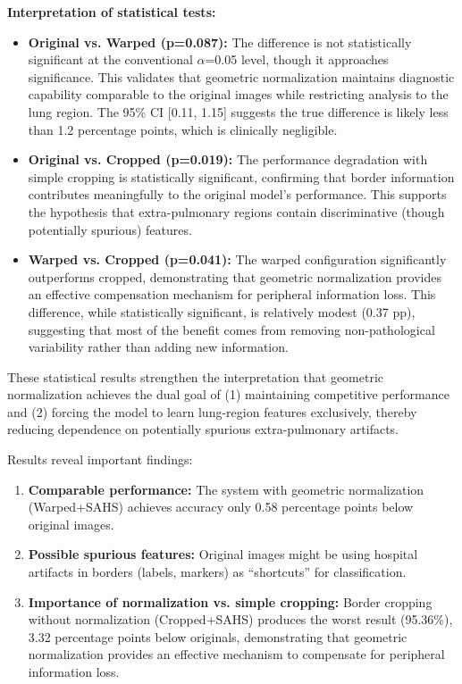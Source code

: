 \documentclass[applsci,article,submit,pdftex,moreauthors]{Definitions/mdpi}
\begin{document}
\textbf{Interpretation of statistical tests:}

\begin{itemize}
\item \textbf{Original vs. Warped (p=0.087):} The difference is not statistically significant at the conventional $\alpha$=0.05 level, though it approaches significance. This validates that geometric normalization maintains diagnostic capability comparable to the original images while restricting analysis to the lung region. The 95\% CI [0.11, 1.15] suggests the true difference is likely less than 1.2 percentage points, which is clinically negligible.

\item \textbf{Original vs. Cropped (p=0.019):} The performance degradation with simple cropping is statistically significant, confirming that border information contributes meaningfully to the original model's performance. This supports the hypothesis that extra-pulmonary regions contain discriminative (though potentially spurious) features.

\item \textbf{Warped vs. Cropped (p=0.041):} The warped configuration significantly outperforms cropped, demonstrating that geometric normalization provides an effective compensation mechanism for peripheral information loss. This difference, while statistically significant, is relatively modest (0.37 pp), suggesting that most of the benefit comes from removing non-pathological variability rather than adding new information.
\end{itemize}

These statistical results strengthen the interpretation that geometric normalization achieves the dual goal of (1) maintaining competitive performance and (2) forcing the model to learn lung-region features exclusively, thereby reducing dependence on potentially spurious extra-pulmonary artifacts.

Results reveal important findings:

\begin{enumerate}
\item \textbf{Comparable performance:} The system with geometric normalization (Warped+SAHS) achieves accuracy only 0.58 percentage points below original images.
\item \textbf{Possible spurious features:} Original images might be using hospital artifacts in borders (labels, markers) as ``shortcuts'' for classification.
\item \textbf{Importance of normalization vs. simple cropping:} Border cropping without normalization (Cropped+SAHS) produces the worst result (95.36\%), 3.32 percentage points below originals, demonstrating that geometric normalization provides an effective mechanism to compensate for peripheral information loss.
\end{enumerate}
\end{document}
